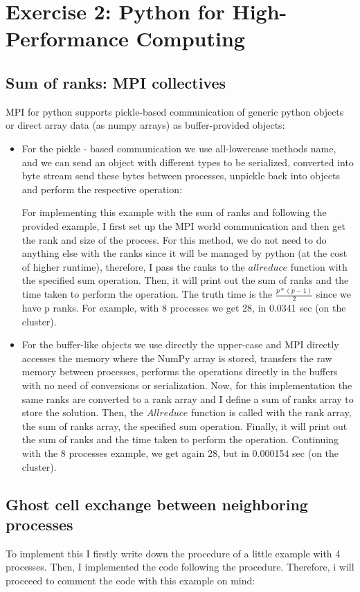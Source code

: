 \documentclass[unicode,11pt,a4paper,oneside,numbers=endperiod,openany]{scrartcl}
\begin{document}
\section{Exercise 2: Python for High-Performance Computing}
\subsection{Sum of ranks: MPI collectives}
MPI for python supports pickle-based communication of generic python objects or direct array data (as numpy arrays) as buffer-provided objects:
\begin{itemize}
  \item For the pickle - based communication we use all-lowercase methods name, and we can send an object with different types to be serialized, converted into byte stream
  send these bytes between processes, unpickle back into objects and perform the respective operation: 

  For implementing this example with the sum of ranks and following the provided example, I first set up the MPI world communication and then get the rank and size of the process. 
  For this method, we do not need to do anything else with the ranks since it will be managed by python (at the cost of higher runtime), therefore, I pass the ranks to the $allreduce$ function with 
  the specified sum operation. Then, it will print out the sum of ranks and the time taken to perform the operation. The truth time is the $\frac{p*(p-1)}{2}$ since we have p ranks. For example, with 8 processes we
  get 28, in 0.0341 sec (on the cluster).

  \item For the buffer-like objects we use directly the upper-case and MPI directly accesses the memory where the NumPy array is stored, transfers the raw memory between processes, 
  performs the operations directly in the buffers with no need of conversions or serialization. Now, for this implementation the same ranks are converted to a rank array and I define a 
  sum of ranks array to store the solution. Then, the $Allreduce$ function is called with the rank array, the sum of ranks array, the specified sum operation.
  Finally, it will print out the sum of ranks and the time taken to perform the operation. Continuing with the 8 processes example, we get again 28, but in 0.000154 sec (on the cluster).
\end{itemize}
\subsection{Ghost cell exchange between neighboring processes}
To implement this I firstly write down the procedure of a little example with 4 processes. Then, I implemented the code following the procedure. Therefore, i will proceeed to comment the code
with this example on mind:
\end{document}
